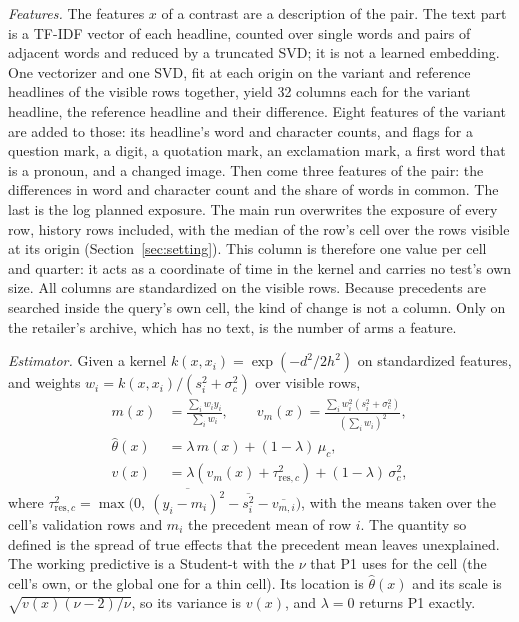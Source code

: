 \emph{Features.} The features $x$ of a contrast are a description of the pair. The text part is a TF-IDF vector of each headline, counted over single words and pairs of adjacent words and reduced by a truncated SVD; it is not a learned embedding. One vectorizer and one SVD, fit at each origin on the variant and reference headlines of the visible rows together, yield 32 columns each for the variant headline, the reference headline and their difference. Eight features of the variant are added to those: its headline's word and character counts, and flags for a question mark, a digit, a quotation mark, an exclamation mark, a first word that is a pronoun, and a changed image. Then come three features of the pair: the differences in word and character count and the share of words in common. The last is the log planned exposure. The main run overwrites the exposure of every row, history rows included, with the median of the row's cell over the rows visible at its origin (Section~\ref{sec:setting}). This column is therefore one value per cell and quarter: it acts as a coordinate of time in the kernel and carries no test's own size. All columns are standardized on the visible rows. Because precedents are searched inside the query's own cell, the kind of change is not a column. Only on the retailer's archive, which has no text, is the number of arms a feature.

\emph{Estimator.} Given a kernel $k(x, x_i) = \exp(-d^2/2h^2)$ on standardized features, and weights $w_i = k(x, x_i)/(s_i^2 + \sigma_c^2)$ over visible rows,
\begin{align}
m(x) &= \frac{\sum_i w_i y_i}{\sum_i w_i}, \qquad
v_m(x) = \frac{\sum_i w_i^2 (s_i^2 + \sigma_c^2)}{(\sum_i w_i)^2}, \\
\hat\theta(x) &= \lambda\, m(x) + (1-\lambda)\, \mu_c, \\
v(x) &= \lambda \left(v_m(x) + \tau_{\mathrm{res},c}^2\right) + (1-\lambda)\, \sigma_c^2 ,
\end{align}
where $\tau_{\mathrm{res},c}^2 = \max\bigl(0,\ \overline{(y_i - m_i)^2} - \overline{s_i^2} - \overline{v_{m,i}}\bigr)$, with the means taken over the cell's validation rows and $m_i$ the precedent mean of row $i$. The quantity so defined is the spread of true effects that the precedent mean leaves unexplained. The working predictive is a Student-t with the $\nu$ that P1 uses for the cell (the cell's own, or the global one for a thin cell). Its location is $\hat\theta(x)$ and its scale is $\sqrt{v(x)(\nu-2)/\nu}$, so its variance is $v(x)$, and $\lambda = 0$ returns P1 exactly.

